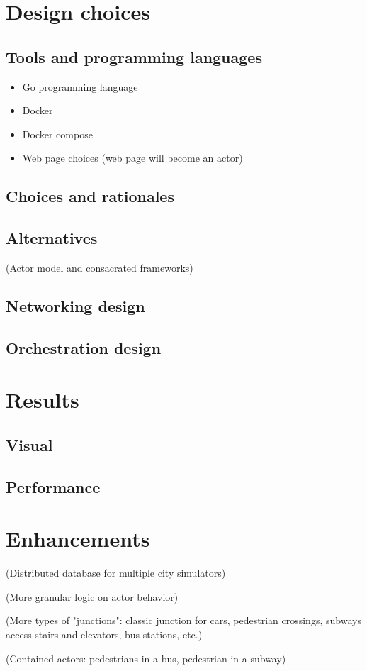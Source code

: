 \documentclass[conference]{IEEEtran}
\begin{document}
\section{Design choices}

\subsection{Tools and programming languages}
\begin{itemize}
\item Go programming language
\item Docker
\item Docker compose
\item Web page choices (web page will become an actor)
\end{itemize}

\subsection{Choices and rationales}

\subsection{Alternatives}
(Actor model and consacrated frameworks)

\subsection{Networking design}

\subsection{Orchestration design}

\section{Results}

\subsection{Visual}

\subsection{Performance}

\section{Enhancements}
(Distributed database for multiple city simulators)

(More granular logic on actor behavior)

(More types of "junctions": classic junction for cars, pedestrian crossings, subways access stairs and elevators, bus stations, etc.)

(Contained actors: pedestrians in a bus, pedestrian in a subway)


\vspace{12pt}
\end{document}
